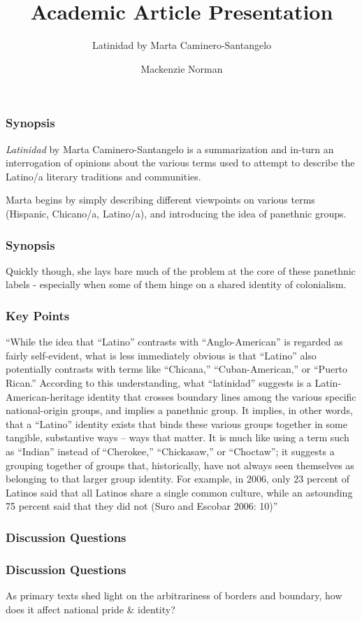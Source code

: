 \documentclass[professionalfont]{beamer}
\title{Academic Article Presentation}
\subtitle{Latinidad by Marta Caminero-Santangelo}
\author{Mackenzie Norman}
\begin{document}
\frame{\titlepage}
\begin{frame}
\frametitle{Synopsis}
\textit{Latinidad} by Marta Caminero-Santangelo is a summarization and in-turn an interrogation of opinions about the various terms used to attempt to describe the Latino/a literary traditions and communities. 

Marta begins by simply describing different viewpoints on various terms (Hispanic, Chicano/a, Latino/a), and introducing the idea of panethnic groups.
\end{frame}
\begin{frame}
\frametitle{Synopsis}
Quickly though, she lays bare much of the problem at the core of these panethnic labels - especially when some of them hinge on a shared identity of colonialism.
\end{frame}
\begin{frame}
\frametitle{Key Points}

\end{frame}
\begin{frame}
``While the idea that “Latino” contrasts with “Anglo-American” is regarded as fairly self-evident, what is less immediately obvious is that “Latino” also potentially contrasts with terms like “Chicana,” “Cuban-American,” or “Puerto Rican.” According to this understanding, what “latinidad” suggests is a Latin-American-heritage identity that crosses boundary lines among the various specific national-origin groups, and implies a panethnic group. It implies, in other words, that a “Latino” identity exists that binds these various groups together in some tangible, substantive ways – ways that matter. It is much like using a term such as “Indian” instead of “Cherokee,” “Chickasaw,” or “Choctaw”; it suggests a grouping together of groups that, historically, have not always seen themselves as belonging to that larger group identity. For example, in 2006, only 23 percent of Latinos said that all Latinos share a single common culture, while an astounding 75 percent said that they did not (Suro and Escobar 2006: 10)''
\end{frame}

\begin{frame}
\frametitle{Discussion Questions}
\end{frame}

\begin{frame}
\frametitle{Discussion Questions}
As primary texts shed light on the arbitrariness of borders and boundary, how does it affect national pride \& identity? 
\end{frame}
\end{document}
